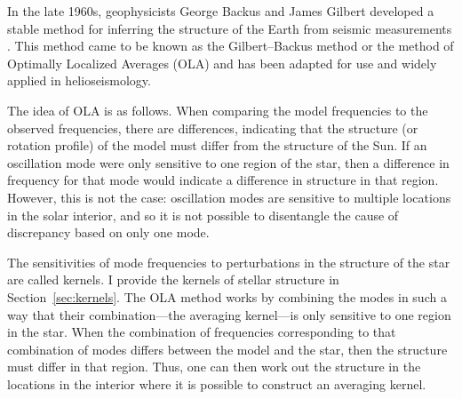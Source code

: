 In the late 1960s, geophysicists George Backus and James Gilbert developed a stable method for inferring the structure of the Earth from seismic measurements  \citep{1968GeoJ...16..169B, 1970RSPTA.266..123B}. 
This method came to be known as the Gilbert--Backus method or the method of Optimally Localized Averages (OLA) and has been adapted for use and widely applied in helioseismology. %

The idea of OLA is as follows. 
When comparing the model frequencies to the observed frequencies, there are differences, indicating that the structure (or rotation profile) of the model must differ from the structure of the Sun. 
If an oscillation mode were only sensitive to one region of the star, then a difference in frequency for that mode would indicate a difference in structure in that region. 
However, this is not the case: oscillation modes are sensitive to multiple locations in the solar interior, and so it is not possible to disentangle the cause of discrepancy based on only one mode. 

The sensitivities of mode frequencies to perturbations in the structure of the star are called kernels. 
I provide the kernels of stellar structure in Section~\ref{sec:kernels}. 
The OLA method works by combining the modes in such a way that their combination---the averaging kernel---is only sensitive to one region in the star. 
When the combination of frequencies corresponding to that combination of modes differs between the model and the star, then the structure must differ in that region. 
Thus, one can then work out the structure in the locations in the interior where it is possible to construct an averaging kernel. 


